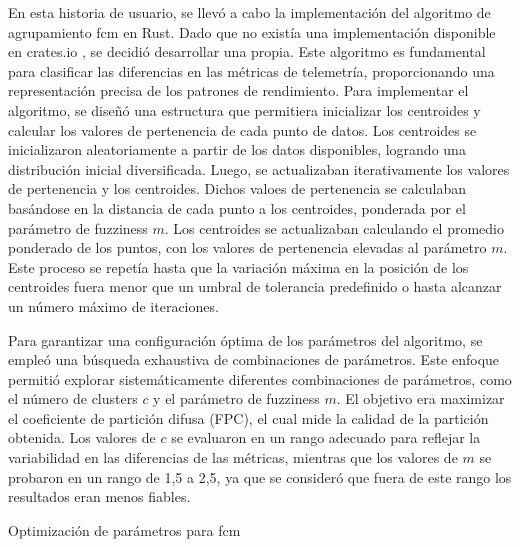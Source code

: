 En esta historia de usuario, se llevó a cabo la implementación del algoritmo de agrupamiento \ac{fcm} en Rust. Dado que no existía una implementación disponible en crates.io \cite{cratesio}, se decidió desarrollar una propia. Este algoritmo es fundamental para clasificar las diferencias en las métricas de telemetría, proporcionando una representación precisa de los patrones de rendimiento.
\newpage
Para implementar el algoritmo, se diseñó una estructura que permitiera inicializar los centroides y calcular los valores de pertenencia de cada punto de datos. Los centroides se inicializaron aleatoriamente a partir de los datos disponibles, logrando una distribución inicial diversificada. Luego, se actualizaban iterativamente los valores de pertenencia y los centroides. Dichos valoes de pertenencia se calculaban basándose en la distancia de cada punto a los centroides, ponderada por el parámetro de fuzziness \( m \). Los centroides se actualizaban calculando el promedio ponderado de los puntos, con los valores de pertenencia elevadas al parámetro \( m \). Este proceso se repetía hasta que la variación máxima en la posición de los centroides fuera menor que un umbral de tolerancia predefinido o hasta alcanzar un número máximo de iteraciones.


Para garantizar una configuración óptima de los parámetros del algoritmo, se empleó una búsqueda exhaustiva de combinaciones de parámetros. Este enfoque permitió explorar sistemáticamente diferentes combinaciones de parámetros, como el número de clusters \( c \) y el parámetro de fuzziness \( m \). El objetivo era maximizar el coeficiente de partición difusa (FPC), el cual mide la calidad de la partición obtenida. Los valores de \( c \) se evaluaron en un rango adecuado para reflejar la variabilidad en las diferencias de las métricas, mientras que los valores de \( m \) se probaron en un rango de 1,5 a 2,5, ya que se consideró que fuera de este rango los resultados eran menos fiables.

\begin{algorithm}[H]
    \SetAlgoLined
    \BlankLine
    \caption{Optimización de parámetros para \ac{fcm}}
    \label{alg:fcm_params}
\end{algorithm}

